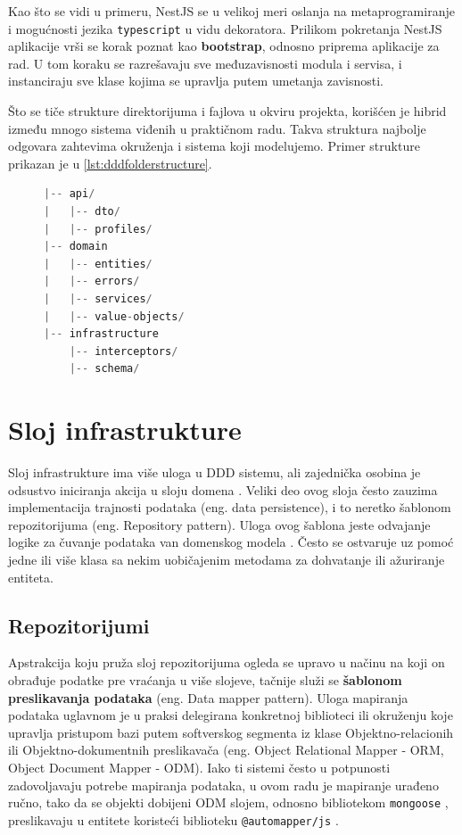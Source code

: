 \documentclass[12pt,oneside]{memoir}
\begin{document}
Kao što se vidi u primeru, NestJS se u velikoj meri oslanja na metaprogramiranje i mogućnosti jezika \verb|typescript| u vidu dekoratora. Prilikom pokretanja NestJS aplikacije vrši se korak poznat kao \textbf{bootstrap}, odnosno priprema aplikacije za rad. U tom koraku se razrešavaju sve međuzavisnosti modula i servisa, i instanciraju sve klase kojima se upravlja putem umetanja zavisnosti.

Što se tiče strukture direktorijuma i fajlova u okviru projekta, korišćen je hibrid između mnogo sistema viđenih u praktičnom radu. Takva struktura najbolje odgovara zahtevima okruženja i sistema koji modelujemo. Primer strukture prikazan je u \ref{lst:dddfolderstructure}.

\begin{figure}[h]
\begin{lstlisting}[language=JavaScript, style=ES6, caption={fajl tickets.module.ts},label={lst:dddfolderstructure}]
|-- api/
|   |-- dto/
|   |-- profiles/
|-- domain
|   |-- entities/
|   |-- errors/
|   |-- services/
|   |-- value-objects/
|-- infrastructure
    |-- interceptors/
    |-- schema/
\end{lstlisting}
\end{figure}

\section{Sloj infrastrukture}

Sloj infrastrukture ima više uloga u DDD sistemu, ali zajednička osobina je odsustvo iniciranja akcija u sloju domena \cite{dddfull}. Veliki deo ovog sloja često zauzima implementacija trajnosti podataka (eng. data persistence), i to neretko šablonom repozitorijuma (eng. Repository pattern). Uloga ovog šablona jeste odvajanje logike za čuvanje podataka van domenskog modela \cite{msrepository}. Često se ostvaruje uz pomoć jedne ili više klasa sa nekim uobičajenim metodama za dohvatanje ili ažuriranje entiteta.


\subsection{Repozitorijumi}
Apstrakcija koju pruža sloj repozitorijuma ogleda se upravo u načinu na koji on obrađuje podatke pre vraćanja u više slojeve, tačnije služi se \textbf{šablonom preslikavanja podataka} (eng. Data mapper pattern). Uloga mapiranja podataka uglavnom je u praksi delegirana konkretnoj biblioteci ili okruženju koje upravlja pristupom bazi putem softverskog segmenta iz klase Objektno-relacionih ili Objektno-dokumentnih preslikavača (eng. Object Relational Mapper - ORM, Object Document Mapper - ODM). Iako ti sistemi često u potpunosti zadovoljavaju potrebe mapiranja podataka, u ovom radu je mapiranje urađeno ručno, tako da se objekti dobijeni ODM slojem, odnosno bibliotekom \verb|mongoose| \cite{mongoosedocs}, preslikavaju u entitete koristeći biblioteku \verb|@automapper/js| \cite{automapperjsdocs}.
\end{document}
